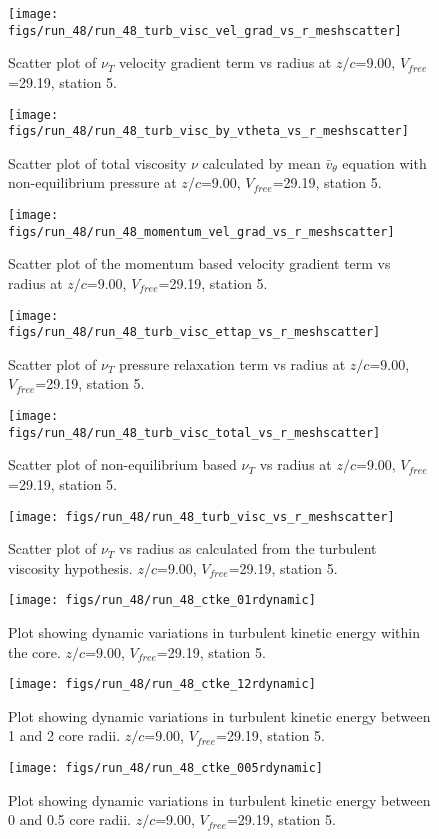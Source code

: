 \begin{figure}[H]
\centering
\texttt{[image: figs/run\_48/run\_48\_turb\_visc\_vel\_grad\_vs\_r\_meshscatter]}
\caption{Scatter plot of $\nu_T$ velocity gradient term vs radius at $z/c$=9.00, $V_{free}$=29.19, station 5.}
\end{figure}


\begin{figure}[H]
\centering
\texttt{[image: figs/run\_48/run\_48\_turb\_visc\_by\_vtheta\_vs\_r\_meshscatter]}
\caption{Scatter plot of total viscosity $\nu$ calculated by mean $\bar{v}_{\theta}$ equation with non-equilibrium pressure at $z/c$=9.00, $V_{free}$=29.19, station 5.}
\end{figure}


\begin{figure}[H]
\centering
\texttt{[image: figs/run\_48/run\_48\_momentum\_vel\_grad\_vs\_r\_meshscatter]}
\caption{Scatter plot of the momentum based velocity gradient term vs radius at $z/c$=9.00, $V_{free}$=29.19, station 5.}
\end{figure}


\begin{figure}[H]
\centering
\texttt{[image: figs/run\_48/run\_48\_turb\_visc\_ettap\_vs\_r\_meshscatter]}
\caption{Scatter plot of $\nu_T$ pressure relaxation term vs radius at $z/c$=9.00, $V_{free}$=29.19, station 5.}
\end{figure}


\begin{figure}[H]
\centering
\texttt{[image: figs/run\_48/run\_48\_turb\_visc\_total\_vs\_r\_meshscatter]}
\caption{Scatter plot of non-equilibrium based $\nu_T$ vs radius at $z/c$=9.00, $V_{free}$=29.19, station 5.}
\end{figure}


\begin{figure}[H]
\centering
\texttt{[image: figs/run\_48/run\_48\_turb\_visc\_vs\_r\_meshscatter]}
\caption{Scatter plot of $\nu_T$ vs radius as calculated from the turbulent viscosity hypothesis. $z/c$=9.00, $V_{free}$=29.19, station 5.}
\end{figure}


\begin{figure}[H]
\centering
\texttt{[image: figs/run\_48/run\_48\_ctke\_01rdynamic]}
\caption{Plot showing dynamic variations in turbulent kinetic energy within the core. $z/c$=9.00, $V_{free}$=29.19, station 5.}
\end{figure}


\begin{figure}[H]
\centering
\texttt{[image: figs/run\_48/run\_48\_ctke\_12rdynamic]}
\caption{Plot showing dynamic variations in turbulent kinetic energy between 1 and 2 core radii. $z/c$=9.00, $V_{free}$=29.19, station 5.}
\end{figure}


\begin{figure}[H]
\centering
\texttt{[image: figs/run\_48/run\_48\_ctke\_005rdynamic]}
\caption{Plot showing dynamic variations in turbulent kinetic energy between 0 and 0.5 core radii. $z/c$=9.00, $V_{free}$=29.19, station 5.}
\end{figure}



